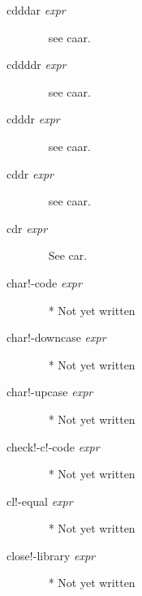 \documentclass[a4paper,11pt]{article}
\begin{document}
\begin{description}
\item[{\ttfamily cdddar} {\itshape expr}]  ~\newline
see {\ttfamily caar}.

\item[{\ttfamily cddddr} {\itshape expr}]  ~\newline
see {\ttfamily caar}.

\item[{\ttfamily cdddr} {\itshape expr}]  ~\newline
see {\ttfamily caar}.

\item[{\ttfamily cddr} {\itshape expr}]  ~\newline
see {\ttfamily caar}.

\item [{\ttfamily cdr} {\itshape expr}]  ~\newline
See {\ttfamily car}.

\item [{\ttfamily char!-code} {\itshape  expr}]  ~\newline
  * Not yet written

\item [{\ttfamily char!-downcase} {\itshape  expr}]  ~\newline
  * Not yet written

\item [{\ttfamily char!-upcase} {\itshape  expr}]  ~\newline
  * Not yet written

\item [{\ttfamily check!-c!-code} {\itshape  expr}]  ~\newline
  * Not yet written

\item [{\ttfamily cl!-equal} {\itshape  expr}]  ~\newline
  * Not yet written

\item [{\ttfamily close!-library} {\itshape  expr}]  ~\newline
  * Not yet written


\end{description}
\end{document}
